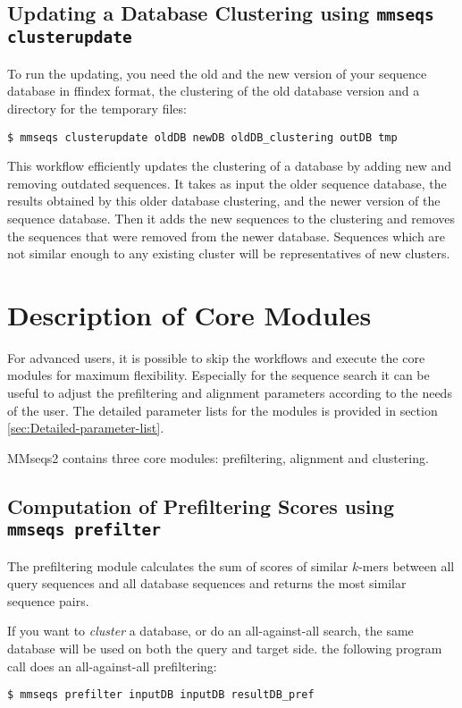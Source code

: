 \documentclass[11pt,a4paper]{scrreprt}
\begin{document}
\subsection{Updating a Database Clustering using \texttt{mmseqs clusterupdate}}
To run the updating, you need the old and the new version of your sequence database in ffindex format, the clustering of the old database version and a directory for the temporary files:


\begin{verbatim}
$ mmseqs clusterupdate oldDB newDB oldDB_clustering outDB tmp
\end{verbatim}


This workflow efficiently updates the clustering of a database by adding new and removing outdated sequences. It takes as input the older sequence database, the results obtained by this older database clustering, and the newer version of the sequence database. Then it adds the new sequences to the clustering and removes the sequences that were removed from the newer database. Sequences which are not similar enough to any existing cluster will be representatives of new clusters.
\section{Description of Core Modules}
For advanced users, it is possible to skip the workflows and execute the core modules for maximum flexibility. Especially for the sequence search it can be useful to adjust the prefiltering and alignment parameters according to the needs of the user. The detailed parameter lists for the modules is provided in section \ref{sec:Detailed-parameter-list}.


MMseqs2 contains three core modules: prefiltering, alignment and clustering.
\subsection{Computation of Prefiltering Scores using \texttt{mmseqs prefilter}} \label{sub:Prefiltering}
The prefiltering module calculates the sum of scores of similar $k$-mers between all query sequences and all database sequences and returns the most similar sequence pairs. 


If you want to \emph{cluster} a database, or do an all-against-all search, the same database will be used on both the query and target side. the following program call does an all-against-all prefiltering: 


\begin{verbatim}
$ mmseqs prefilter inputDB inputDB resultDB_pref 
\end{verbatim}
\end{document}
